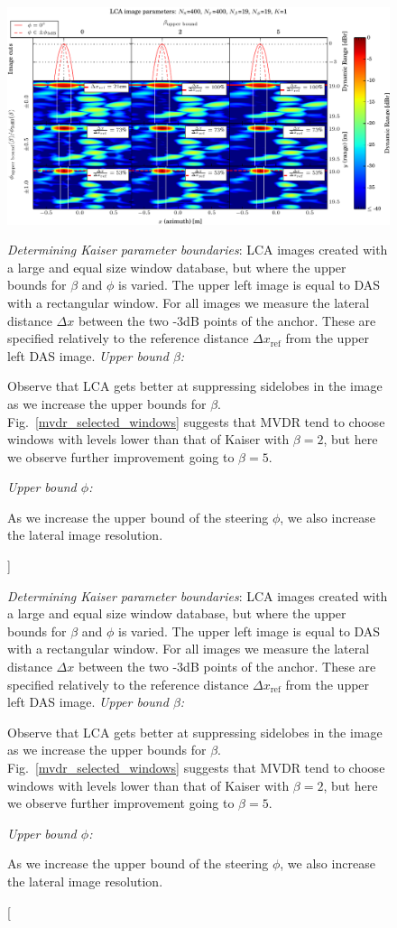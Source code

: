 \documentclass[10pt,journal,draftclsnofoot,onecolumn]{IEEEtran}
\let\MYoriglatexcaption\caption               %
\renewcommand{\caption}[2][\relax]{\MYoriglatexcaption[#2]{#2}}
\newcommand\Fig[1]{Fig.~\ref{#1}}
\newcommand\1{\vec 1}
\begin{document}
\begin{figure}[t]%
\includegraphics[width=\textwidth]{gfx/oversampling_mosaic_bounds.pdf}%
\caption{\emph{Determining Kaiser parameter boundaries}: LCA images created with a large and equal size window database, but where the upper bounds for $\beta$ and $\phi$ is varied. The upper left image is equal to DAS with a rectangular window. For all images we measure the lateral distance $\Delta x$ between the two -3dB points of the anchor. These are specified relatively to the reference distance  $\Delta x_\text{ref}$ from the upper left DAS image.
\newline
\emph{Upper bound $\beta$:}\hfill
\parbox[t]{.89\linewidth}{Observe that LCA gets better at suppressing sidelobes in the image as we increase the upper bounds for $\beta$. \Fig{mvdr_selected_windows} suggests that MVDR tend to choose windows with levels lower than that of Kaiser with $\beta=2$, but here we observe further improvement going to $\beta=5$.}\newline
\emph{Upper bound $\phi$:}\hfill
\parbox[t]{.89\linewidth}{As we increase the upper bound of the steering $\phi$, we also increase the lateral image resolution. }
}\label{oversampling_mosaic_bounds}
\end{figure}

\end{document}
